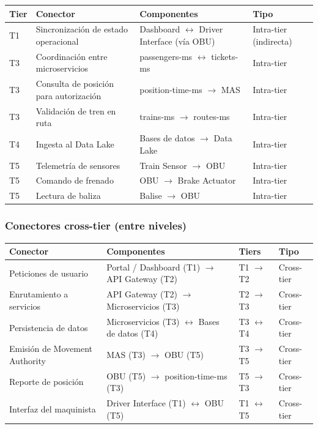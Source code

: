 \documentclass[a4paper, 10 pt]{article}
\begin{document}
\begin{table}[H]
\centering
\footnotesize
\begin{tabular}{|M{0.05\textwidth}|R{0.22\textwidth}|R{0.35\textwidth}|M{0.15\textwidth}|}
\hline
\textbf{Tier} & \textbf{Conector} & \textbf{Componentes} & \textbf{Tipo} \\
\hline
T1 & Sincronización de estado operacional & Dashboard $\leftrightarrow$ Driver Interface (vía OBU) & Intra-tier (indirecta) \\
\hline
T3 & Coordinación entre microservicios & passengers-ms $\leftrightarrow$ tickets-ms & Intra-tier \\
\hline
T3 & Consulta de posición para autorización & position-time-ms $\rightarrow$ MAS & Intra-tier \\
\hline
T3 & Validación de tren en ruta & trains-ms $\rightarrow$ routes-ms & Intra-tier \\
\hline
T4 & Ingesta al Data Lake & Bases de datos $\rightarrow$ Data Lake & Intra-tier \\
\hline
T5 & Telemetría de sensores & Train Sensor $\rightarrow$ OBU & Intra-tier \\
\hline
T5 & Comando de frenado & OBU $\rightarrow$ Brake Actuator & Intra-tier \\
\hline
T5 & Lectura de baliza & Balise $\rightarrow$ OBU & Intra-tier \\
\hline
\end{tabular}
\end{table}

\subsubsection{Conectores cross-tier (entre niveles)}

\begin{table}[H]
\centering
\footnotesize
\begin{tabular}{|R{0.18\textwidth}|R{0.28\textwidth}|M{0.12\textwidth}|M{0.12\textwidth}|}
\hline
\textbf{Conector} & \textbf{Componentes} & \textbf{Tiers} & \textbf{Tipo} \\
\hline
Peticiones de usuario & Portal / Dashboard (T1) $\rightarrow$ API Gateway (T2) & T1 $\rightarrow$ T2 & Cross-tier \\
\hline
Enrutamiento a servicios & API Gateway (T2) $\rightarrow$ Microservicios (T3) & T2 $\rightarrow$ T3 & Cross-tier \\
\hline
Persistencia de datos & Microservicios (T3) $\leftrightarrow$ Bases de datos (T4) & T3 $\leftrightarrow$ T4 & Cross-tier \\
\hline
Emisión de Movement Authority & MAS (T3) $\rightarrow$ OBU (T5) & T3 $\rightarrow$ T5 & Cross-tier \\
\hline
Reporte de posición & OBU (T5) $\rightarrow$ position-time-ms (T3) & T5 $\rightarrow$ T3 & Cross-tier \\
\hline
Interfaz del maquinista & Driver Interface (T1) $\leftrightarrow$ OBU (T5) & T1 $\leftrightarrow$ T5 & Cross-tier \\
\hline
\end{tabular}
\end{table}
\end{document}
